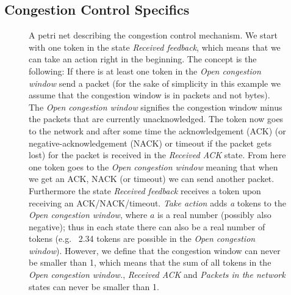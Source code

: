 \documentclass[sigconf]{acmart}
\newcommand\note[2]{{\color{#1}#2}}
\newcommand\todo[1]{{\note{red}{TODO: #1}}}
\begin{document}
\subsection{Congestion Control Specifics}

\begin{figure}



\caption{A petri net describing the congestion control mechanism. We start with one token in the state \textit{Received feedback}, which means that we can take an action right in the beginning. The concept is the following: If there is at least one token in the \textit{Open congestion window} send a packet (for the sake of simplicity in this example we assume that the congestion window is in packets and not bytes). The \textit{Open congestion window} signifies the congestion window minus the packets that are currently unacknowledged. The token now goes to the network and after some time the acknowledgement (ACK) (or negative-acknowledgement (NACK) or timeout if the packet gets lost) for the packet is received in the \textit{Received ACK} state. From here one token goes to the \textit{Open congestion window} meaning that when we get an ACK, NACK (or timeout) we can send another packet. Furthermore the state \textit{Received feedback} receives a token upon receiving an ACK/NACK/timeout. \textit{Take action} adds \textit{a} tokens to the \textit{Open congestion window}, where $a$ is a real number (possibly also negative); thus in each state there can also be a real number of tokens (e.g.~ 2.34 tokens are possible in the \textit{Open congestion window}). However, we define that the congestion window can never be smaller than 1, which means that the sum of all tokens in the \textit{Open congestion window.}, \textit{Received ACK} and \textit{Packets in the network} states can never be smaller than 1.}
\label{fig:petri}
\end{figure}

\end{document}
